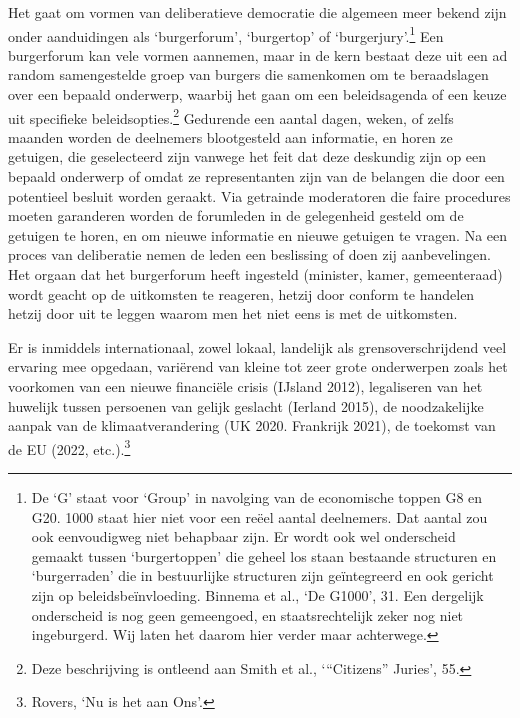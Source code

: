 \documentclass[smallauthor, chapterhaspagenum, nochapterinheader, pagenuminheader,  bigchapnum,medium2, tocpages, garamond, titleinheader]{jote-book}
\begin{document}
	Het gaat om vormen van deliberatieve democratie die algemeen meer bekend zijn onder aanduidingen als ‘burgerforum', ‘burgertop' of ‘burgerjury'.\footnote{De ‘G' staat voor ‘Group' in navolging van de economische toppen G8 en G20. 1000 staat hier niet voor een reëel aantal deelnemers. Dat aantal zou ook eenvoudigweg niet behapbaar zijn. Er wordt ook wel onderscheid gemaakt tussen ‘burgertoppen' die geheel los staan bestaande structuren en ‘burgerraden' die in bestuurlijke structuren zijn geïntegreerd en ook gericht zijn op beleidsbeïnvloeding. Binnema et al., ‘De G1000', 31. Een dergelijk onderscheid is nog geen gemeengoed, en staatsrechtelijk zeker nog niet ingeburgerd. Wij laten het daarom hier verder maar achterwege.} Een burgerforum kan vele vormen aannemen, maar in de kern bestaat deze uit een ad random samengestelde groep van burgers die samenkomen om te beraadslagen over een bepaald onderwerp, waarbij het gaan om een beleidsagenda of een keuze uit specifieke beleidsopties.\footnote{Deze beschrijving is ontleend aan Smith et al., ‘“Citizens” Juries', 55.} Gedurende een aantal dagen, weken, of zelfs maanden worden de deelnemers blootgesteld aan informatie, en horen ze getuigen, die geselecteerd zijn vanwege het feit dat deze deskundig zijn op een bepaald onderwerp of omdat ze representanten zijn van de belangen die door een potentieel besluit worden geraakt. Via getrainde moderatoren die faire procedures moeten garanderen worden de forumleden in de gelegenheid gesteld om de getuigen te horen, en om nieuwe informatie en nieuwe getuigen te vragen. Na een proces van deliberatie nemen de leden een beslissing of doen zij aanbevelingen. Het orgaan dat het burgerforum heeft ingesteld (minister, kamer, gemeenteraad) wordt geacht op de uitkomsten te reageren, hetzij door conform te handelen hetzij door uit te leggen waarom men het niet eens is met de uitkomsten.



	Er is inmiddels internationaal, zowel lokaal, landelijk als grensoverschrijdend veel ervaring mee opgedaan, variërend van kleine tot zeer grote onderwerpen zoals het voorkomen van een nieuwe financiële crisis (IJsland 2012), legaliseren van het huwelijk tussen persoenen van gelijk geslacht (Ierland 2015), de noodzakelijke aanpak van de klimaatverandering (UK 2020. Frankrijk 2021), de toekomst van de EU (2022, etc.).\footnote{Rovers, ‘Nu is het aan Ons'.}
\end{document}
